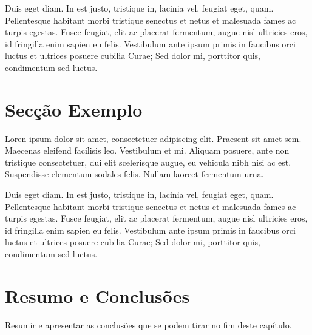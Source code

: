 Duis eget diam. In est justo, tristique in, lacinia vel, feugiat eget,
quam. Pellentesque habitant morbi tristique senectus et netus et
malesuada fames ac turpis egestas. Fusce feugiat, elit ac placerat
fermentum, augue nisl ultricies eros, id fringilla enim sapien eu
felis. Vestibulum ante ipsum primis in faucibus orci luctus et
ultrices posuere cubilia Curae; Sed dolor mi, porttitor quis,
condimentum sed luctus. 

\section{Secção Exemplo}

Loren ipsum dolor sit amet, consectetuer adipiscing elit. 
Praesent sit amet sem. Maecenas eleifend facilisis leo. Vestibulum et
mi. Aliquam posuere, ante non tristique consectetuer, dui elit
scelerisque augue, eu vehicula nibh nisi ac est. Suspendisse elementum
sodales felis. Nullam laoreet fermentum urna. 

Duis eget diam. In est justo, tristique in, lacinia vel, feugiat eget,
quam. Pellentesque habitant morbi tristique senectus et netus et
malesuada fames ac turpis egestas. Fusce feugiat, elit ac placerat
fermentum, augue nisl ultricies eros, id fringilla enim sapien eu
felis. Vestibulum ante ipsum primis in faucibus orci luctus et
ultrices posuere cubilia Curae; Sed dolor mi, porttitor quis,
condimentum sed luctus. 

\section{Resumo e Conclusões}

Resumir e apresentar as conclusões que se podem tirar no fim deste
capítulo.
